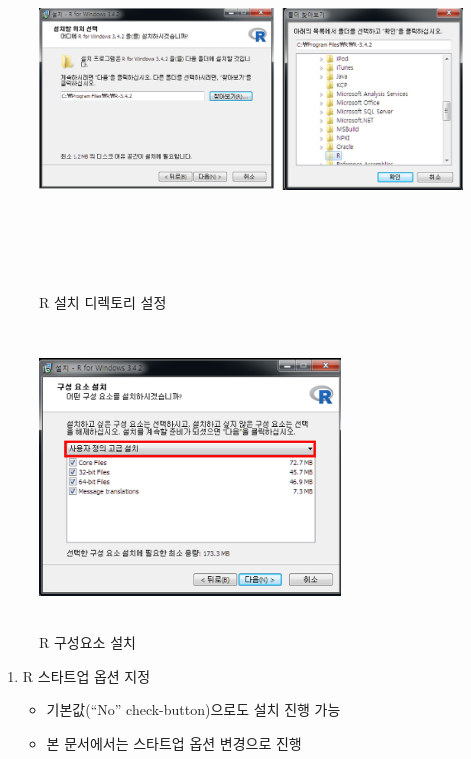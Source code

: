 \documentclass[12pt,a4paper]{book}
\providecommand{\tightlist}{%
  \setlength{\itemsep}{0pt}\setlength{\parskip}{0pt}}
\theoremstyle{definition}
\theoremstyle{definition}
\theoremstyle{definition}
\theoremstyle{remark}
\begin{document}
\begin{figure}[H]
{
  \centering
  \includegraphics[width = 15cm, height = 10cm]{Figures/R-install-F03.png}
  \caption[R 설치 디렉토리 설정]{R 설치 디렉토리 설정}\label{fig:R-install-08}
}
\end{figure}

\begin{figure}[H]
{
  \centering
  \includegraphics[width = 8cm, height = 8cm]{Figures/R-install-F04.png}
  \caption[R 구성요소 설치]{R 구성요소 설치}\label{fig:R-install-09}
}
\end{figure}

\begin{enumerate}
\def\labelenumi{\arabic{enumi}.}
\setcounter{enumi}{10}
\tightlist
\item
  R 스타트업 옵션 지정

  \begin{itemize}
  \tightlist
  \item
    기본값(``No'' check-button)으로도 설치 진행 가능
  \item
    본 문서에서는 스타트업 옵션 변경으로 진행
  \end{itemize}
\end{enumerate}
\end{document}
